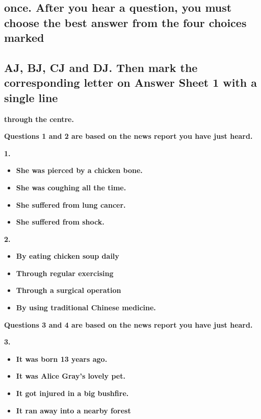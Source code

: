 \documentclass[UTF8,11pt]{ctexart}
\begin{document}
\subsection*{\textbf{once. After you hear a question, you must choose the best answer from the four choices marked}}


\subsection*{\textbf{AJ, BJ, CJ and DJ. Then mark the corresponding letter on Answer Sheet 1 with a single line}}


\textbf{through the centre.}


\textbf{Questions 1 and 2 are based on the news report you have just heard.}


\textbf{1.}


\begin{itemize}[leftmargin=2em,itemsep=.2em,topsep=.4em]\item[A.] \textbf{She was pierced by a chicken bone.}
\item[B.] \textbf{She was coughing all the time.}
\item[C.] \textbf{She suffered from lung cancer.}
\item[D.] \textbf{She suffered from shock.}
\end{itemize}

\textbf{2.}


\begin{itemize}[leftmargin=2em,itemsep=.2em,topsep=.4em]\item[A.] \textbf{By eating chicken soup daily}
\item[B.] \textbf{Through regular exercising}
\item[C.] \textbf{Through a surgical operation}
\item[D.] \textbf{By using traditional Chinese medicine.}
\end{itemize}

\textbf{Questions 3 and 4 are based on the news report you have just heard.}


\textbf{3.}


\begin{itemize}[leftmargin=2em,itemsep=.2em,topsep=.4em]\item[A.] \textbf{It was born 13 years ago.}
\item[B.] \textbf{It was Alice Gray's lovely pet.}
\item[C.] \textbf{It got injured in a big bushfire.}
\item[D.] \textbf{It ran away into a nearby forest}
\end{itemize}
\end{document}
